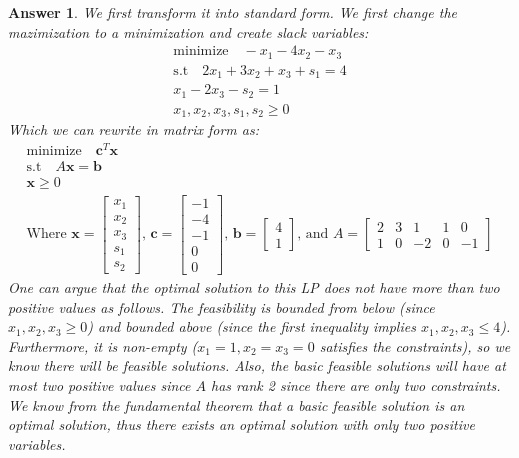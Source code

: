 \documentclass[12pt]{article}
\theoremstyle{colon}
\newtheorem*{answer}{Answer}
\begin{document}
\begin{answer}
  We first transform it into standard form. We first change the mazimization to a minimization and create slack variables:
  \begin{gather*}
    \text{minimize} \quad -x_1 - 4x_2 - x_3 \\
    \text{s.t} \quad 2x_1 + 3x_2 + x_3 + s_1 = 4 \\
    x_1 - 2x_3 - s_2 = 1 \\
    x_1, x_2, x_3, s_1, s_2 \geq 0
  \end{gather*}
  Which we can rewrite in matrix form as:
  \begin{gather*}
    \text{minimize} \quad \textbf{c}^T\textbf{x} \\
    \text{s.t} \quad A\textbf{x} = \textbf{b} \\
    \textbf{x} \geq 0 \\
    \text{Where } \textbf{x} = \begin{bmatrix}
      x_1 \\
      x_2 \\
      x_3 \\
      s_1 \\
      s_2
    \end{bmatrix}
    \text{, } \textbf{c} = \begin{bmatrix}
      -1 \\
      -4 \\
      -1 \\
      0 \\
      0
    \end{bmatrix}
    \text{, } \textbf{b} = \begin{bmatrix}
      4 \\
      1
    \end{bmatrix}
    \text{, and } A = \begin{bmatrix}
      2 & 3 & 1 & 1 & 0 \\
      1 & 0 & -2 & 0 & -1
    \end{bmatrix}
  \end{gather*}
  One can argue that the optimal solution to this LP does not have more than two positive values as follows. The feasibility is bounded from below (since $x_1, x_2, x_3 \geq 0$) and bounded above (since the first inequality implies $x_1, x_2, x_3 \leq 4$). Furthermore, it is non-empty ($x_1 = 1, x_2=x_3=0$ satisfies the constraints), so we know there will be feasible solutions. Also, the basic feasible solutions will have at most two positive values since $A$ has rank 2 since there are only two constraints. We know from the fundamental theorem that a basic feasible solution is an optimal solution, thus there exists an optimal solution with only two positive variables.


\end{answer}
\end{document}
